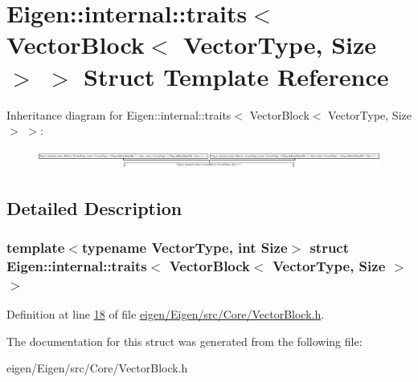 \hypertarget{struct_eigen_1_1internal_1_1traits_3_01_vector_block_3_01_vector_type_00_01_size_01_4_01_4}{}\section{Eigen\+:\+:internal\+:\+:traits$<$ Vector\+Block$<$ Vector\+Type, Size $>$ $>$ Struct Template Reference}
\label{struct_eigen_1_1internal_1_1traits_3_01_vector_block_3_01_vector_type_00_01_size_01_4_01_4}
Inheritance diagram for Eigen\+:\+:internal\+:\+:traits$<$ Vector\+Block$<$ Vector\+Type, Size $>$ $>$\+:\begin{figure}[H]
\begin{center}
\leavevmode
\includegraphics[height=0.632054cm]{struct_eigen_1_1internal_1_1traits_3_01_vector_block_3_01_vector_type_00_01_size_01_4_01_4}
\end{center}
\end{figure}


\subsection{Detailed Description}
\subsubsection*{template$<$typename Vector\+Type, int Size$>$\newline
struct Eigen\+::internal\+::traits$<$ Vector\+Block$<$ Vector\+Type, Size $>$ $>$}



Definition at line \hyperlink{eigen_2_eigen_2src_2_core_2_vector_block_8h_source_l00018}{18} of file \hyperlink{eigen_2_eigen_2src_2_core_2_vector_block_8h_source}{eigen/\+Eigen/src/\+Core/\+Vector\+Block.\+h}.



The documentation for this struct was generated from the following file\+:\begin{DoxyCompactItemize}
\item 
eigen/\+Eigen/src/\+Core/\+Vector\+Block.\+h\end{DoxyCompactItemize}
